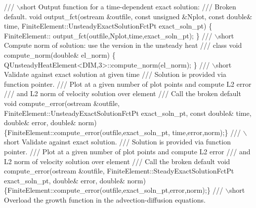 \begin{DoxyCodeInclude}
\textcolor{comment}{}
\textcolor{comment}{ /// \(\backslash\)short Output function for a time-dependent exact solution:}
\textcolor{comment}{ /// Broken default.}
\textcolor{comment}{} \textcolor{keywordtype}{void} output\_fct(ostream &outfile, \textcolor{keyword}{const} \textcolor{keywordtype}{unsigned} &Nplot,
                 \textcolor{keyword}{const} \textcolor{keywordtype}{double}& time,
                 FiniteElement::UnsteadyExactSolutionFctPt 
                 exact\_soln\_pt)
  \{
   FiniteElement::
    output\_fct(outfile,Nplot,time,exact\_soln\_pt);
  \}
  \textcolor{comment}{}
\textcolor{comment}{ /// \(\backslash\)short Compute norm of solution: use the version in the unsteady heat}
\textcolor{comment}{ /// class }
\textcolor{comment}{} \textcolor{keywordtype}{void} compute\_norm(\textcolor{keywordtype}{double}& el\_norm)
 \{
  QUnsteadyHeatElement<DIM,3>::compute\_norm(el\_norm);
 \}
\textcolor{comment}{}
\textcolor{comment}{ /// \(\backslash\)short Validate against exact solution at given time}
\textcolor{comment}{ /// Solution is provided via function pointer.}
\textcolor{comment}{ /// Plot at a given number of plot points and compute L2 error}
\textcolor{comment}{ /// and L2 norm of velocity solution over element}
\textcolor{comment}{ /// Call the broken default}
\textcolor{comment}{} \textcolor{keywordtype}{void} compute\_error(ostream &outfile,
                    FiniteElement::UnsteadyExactSolutionFctPt exact\_soln\_pt,
                    \textcolor{keyword}{const} \textcolor{keywordtype}{double}& time,
                    \textcolor{keywordtype}{double}& error, \textcolor{keywordtype}{double}& norm)
  \{FiniteElement::compute\_error(outfile,exact\_soln\_pt,
                                time,error,norm);\}
 \textcolor{comment}{}
\textcolor{comment}{ /// \(\backslash\)short Validate against exact solution.}
\textcolor{comment}{ /// Solution is provided via function pointer.}
\textcolor{comment}{ /// Plot at a given number of plot points and compute L2 error}
\textcolor{comment}{ /// and L2 norm of velocity solution over element}
\textcolor{comment}{ /// Call the broken default}
\textcolor{comment}{} \textcolor{keywordtype}{void} compute\_error(ostream &outfile,
                    FiniteElement::SteadyExactSolutionFctPt exact\_soln\_pt,
                    \textcolor{keywordtype}{double}& error, \textcolor{keywordtype}{double}& norm)
  \{FiniteElement::compute\_error(outfile,exact\_soln\_pt,error,norm);\}
\textcolor{comment}{}
\textcolor{comment}{ /// \(\backslash\)short Overload the growth function in the advection-diffusion equations.}

\end{DoxyCodeInclude}
